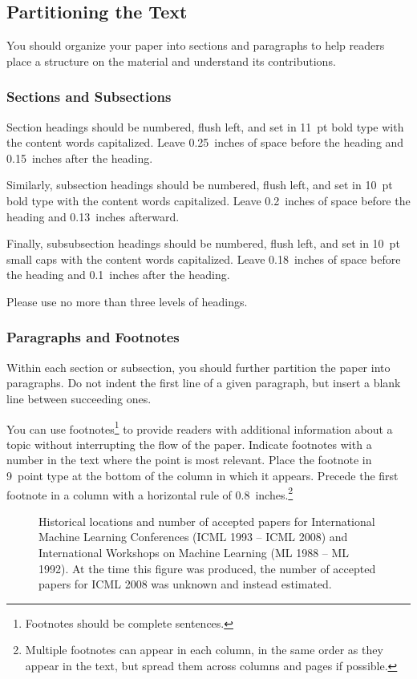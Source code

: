 \documentclass{article}
\theoremstyle{plain}
\theoremstyle{definition}
\theoremstyle{remark}
\begin{document}
\subsection{Partitioning the Text}

You should organize your paper into sections and paragraphs to help
readers place a structure on the material and understand its
contributions.

\subsubsection{Sections and Subsections}

Section headings should be numbered, flush left, and set in 11~pt bold
type with the content words capitalized. Leave 0.25~inches of space
before the heading and 0.15~inches after the heading.

Similarly, subsection headings should be numbered, flush left, and set
in 10~pt bold type with the content words capitalized. Leave
0.2~inches of space before the heading and 0.13~inches afterward.

Finally, subsubsection headings should be numbered, flush left, and
set in 10~pt small caps with the content words capitalized. Leave
0.18~inches of space before the heading and 0.1~inches after the
heading.

Please use no more than three levels of headings.

\subsubsection{Paragraphs and Footnotes}

Within each section or subsection, you should further partition the
paper into paragraphs. Do not indent the first line of a given
paragraph, but insert a blank line between succeeding ones.

You can use footnotes\footnote{Footnotes
should be complete sentences.} to provide readers with additional
information about a topic without interrupting the flow of the paper.
Indicate footnotes with a number in the text where the point is most
relevant. Place the footnote in 9~point type at the bottom of the
column in which it appears. Precede the first footnote in a column
with a horizontal rule of 0.8~inches.\footnote{Multiple footnotes can
appear in each column, in the same order as they appear in the text,
but spread them across columns and pages if possible.}

\begin{figure}[ht]
\vskip 0.2in
\begin{center}
\centerline{\fbox{\rule{0pt}{1.4in}\rule{\columnwidth}{0pt}}}
\caption{Historical locations and number of accepted papers for International
Machine Learning Conferences (ICML 1993 -- ICML 2008) and International
Workshops on Machine Learning (ML 1988 -- ML 1992). At the time this figure was
produced, the number of accepted papers for ICML 2008 was unknown and instead
estimated.}
\label{icml-historical}
\end{center}
\vskip -0.2in
\end{figure}
\end{document}
